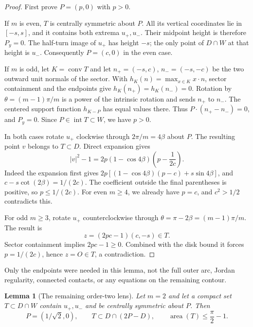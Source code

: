 \documentclass[11pt]{article}
\newtheorem{lemma}[theorem]{Lemma}
\newcommand{\interior}{\operatorname{int}}
\newcommand{\conv}{\operatorname{conv}}
\newcommand{\area}{\operatorname{area}}
\begin{document}
\begin{proof}
First prove $P=(p,0)$ with $p>0$.

If $m$ is even, $T$ is centrally symmetric about $P$. All its vertical
coordinates lie in $[-s,s]$, and it contains both extrema $u_+,u_-$.
Their midpoint height is therefore $P_y=0$. The half-turn image of $u_+$
has height $-s$; the only point of $D\cap W$ at that height is $u_-$.
Consequently $P=(c,0)$ in the even case.

If $m$ is odd, let $K=\conv T$ and let
$n_+=(-s,c)$, $n_-=(-s,-c)$ be the two outward unit normals of the sector.
With $h_K(n)=\max_{x\in K}x\cdot n$, sector containment and the endpoints
give $h_K(n_+)=h_K(n_-)=0$. Rotation by
$\theta=(m-1)\pi/m$ is a power of the intrinsic rotation and sends $n_+$
to $n_-$. The centered support function $h_{K-P}$ has equal values there.
Thus $P\cdot(n_+-n_-)=0$, and $P_y=0$. Since $P\in\interior T\subset W$,
we have $p>0$.

In both cases rotate $u_+$ clockwise through $2\pi/m=4\beta$ about $P$.
The resulting point $v$ belongs to $T\subset D$. Direct expansion gives
\begin{equation}\label{eq:disk}
 |v|^2-1
 =2p(1-\cos4\beta)\left(p-\frac1{2c}\right).
\end{equation}
Indeed the expansion first gives
$2p[(1-\cos4\beta)(p-c)+s\sin4\beta]$, and
$c-s\cot(2\beta)=1/(2c)$.
The coefficient outside the final parentheses is positive, so $p\leq1/(2c)$.
For even $m\geq4$, we already have $p=c$, and $c^2>1/2$ contradicts this.

For odd $m\geq3$, rotate $u_+$ counterclockwise through
$\theta=\pi-2\beta=(m-1)\pi/m$. The result is
\begin{equation}\label{eq:ray}
 z=(2pc-1)(c,-s)\in T.
\end{equation}
Sector containment implies $2pc-1\geq0$. Combined with the disk bound it
forces $p=1/(2c)$, hence $z=O\in T$, a contradiction.
\end{proof}

Only the endpoints were needed in this lemma, not the full outer arc, Jordan
regularity, connected contacts, or any equations on the remaining contour.

\begin{lemma}[The remaining order-two lens]\label{lem:lens}
Let $m=2$ and let a compact set $T\subset D\cap W$ contain $u_+,u_-$ and
be centrally symmetric about $P$. Then
\[
 P=(1/\sqrt2,0),\qquad
 T\subset D\cap(2P-D),\qquad
 \area(T)\leq\frac\pi2-1.
\]
\end{lemma}
\end{document}
